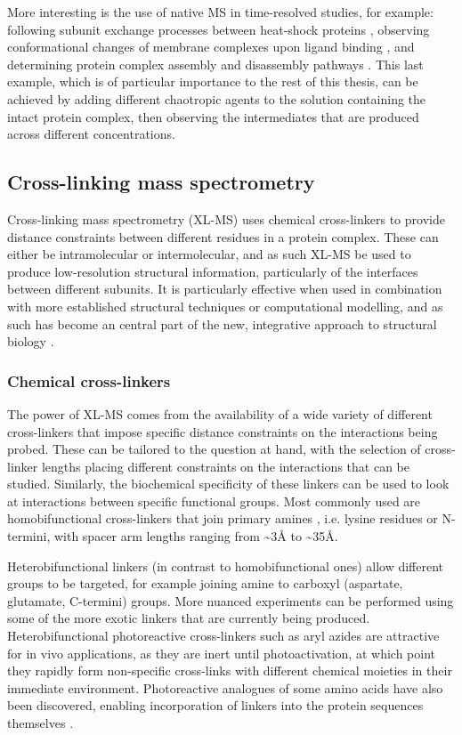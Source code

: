 \documentclass[a4paper,11pt,twoside,openright]{scrbook}
\begin{document}
More interesting is the use of native MS in time-resolved studies, for example: following subunit exchange processes between heat-shock proteins \cite{Sobott2002a}, observing conformational changes of membrane complexes upon ligand binding \cite{Laganowsky2014}, and determining protein complex assembly and disassembly pathways \cite{Levy2008}. This last example, which is of particular importance to the rest of this thesis, can be achieved by adding different chaotropic agents to the solution containing the intact protein complex, then observing the intermediates that are produced across different concentrations.

\subsection{Cross-linking mass spectrometry}
Cross-linking mass spectrometry (XL-MS) uses chemical cross-linkers to provide distance constraints between different residues in a protein complex. These can either be intramolecular or intermolecular, and as such XL-MS be used to produce low-resolution structural information, particularly of the interfaces between different subunits. It is particularly effective when used in combination with more established structural techniques or computational modelling, and as such has become an central part of the new, integrative approach to structural biology \cite{Stengel2012,Ward2013,VandenBedem2015}.

\subsubsection{Chemical cross-linkers}
The power of XL-MS comes from the availability of a wide variety of different cross-linkers that impose specific distance constraints on the interactions being probed. These can be tailored to the question at hand, with the selection of cross-linker lengths placing different constraints on the interactions that can be studied. Similarly, the biochemical specificity of these linkers can be used to look at interactions between specific functional groups. Most commonly used are homobifunctional cross-linkers that join primary amines \cite{Leitner2016}, i.e. lysine residues or N-termini, with spacer arm lengths ranging from \textasciitilde 3Å to \textasciitilde 35Å.

Heterobifunctional linkers (in contrast to homobifunctional ones) allow different groups to be targeted, for example joining amine to carboxyl (aspartate, glutamate, C-termini) groups. More nuanced experiments can be performed using some of the more exotic linkers that are currently being produced. Heterobifunctional photoreactive cross-linkers such as aryl azides are attractive for in vivo applications, as they are inert until photoactivation, at which point they rapidly form non-specific cross-links with different chemical moieties in their immediate environment. Photoreactive analogues of some amino acids have also been discovered, enabling incorporation of linkers into the protein sequences themselves \cite{Suchanek2005}.
\end{document}
